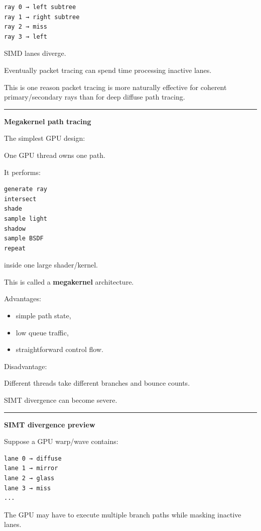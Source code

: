 \begin{verbatim}
ray 0 → left subtree
ray 1 → right subtree
ray 2 → miss
ray 3 → left
\end{verbatim}

SIMD lanes diverge.

Eventually packet tracing can spend time processing inactive lanes.

This is one reason packet tracing is more naturally effective for coherent primary/secondary rays than for deep diffuse path tracing.

\begin{center}\rule{0.5\linewidth}{0.5pt}\end{center}

\textbf{Megakernel path tracing}

The simplest GPU design:

One GPU thread owns one path.

It performs:

\begin{verbatim}
generate ray
intersect
shade
sample light
shadow
sample BSDF
repeat
\end{verbatim}

inside one large shader/kernel.

This is called a \textbf{megakernel} architecture.

Advantages:

\begin{itemize}
\tightlist
\item
  simple path state,
\item
  low queue traffic,
\item
  straightforward control flow.
\end{itemize}

Disadvantage:

Different threads take different branches and bounce counts.

SIMT divergence can become severe.

\begin{center}\rule{0.5\linewidth}{0.5pt}\end{center}

\textbf{SIMT divergence preview}

Suppose a GPU warp/wave contains:

\begin{verbatim}
lane 0 → diffuse
lane 1 → mirror
lane 2 → glass
lane 3 → miss
...
\end{verbatim}

The GPU may have to execute multiple branch paths while masking inactive lanes.

